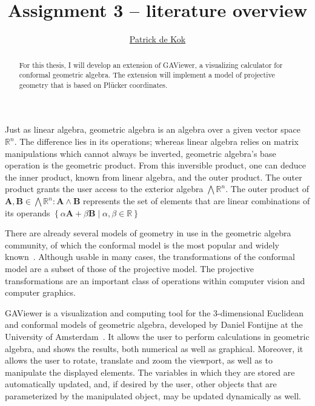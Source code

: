 \documentclass[a4paper,11pt,twoside]{article}
\title{Assignment 3 -- literature overview}
\author{\href{mailto:pkok@science.uva.nl}{Patrick de Kok}}
\newcommand{\V}[1]{\ensuremath{\mathbf{#1}}}
\newcommand{\reals}{\ensuremath{\mathbb{R}}}
\begin{document}
\maketitle
\begin{abstract}
For this thesis, I will develop an extension of GAViewer, a visualizing calculator for conformal geometric algebra.  The extension will implement a model of projective geometry that is based on Pl\"ucker coordinates.
\end{abstract}

Just as linear algebra, geometric algebra is an algebra over a given vector space $\reals^n$.  The difference lies in its operations; whereas linear algebra relies on matrix manipulations which cannot always be inverted, geometric algebra's base operation is the geometric product.  From this inversible product, one can deduce the inner product, known from linear algebra, and the outer product.  The outer product grants the user access to the exterior algebra $\bigwedge \reals^n$.  The outer product of $\V{A}, \V{B} \in \bigwedge \reals^n: \V{A} \wedge \V{B}$ represents the set of elements that are linear combinations of its operands $\left\{\alpha \V{A} + \beta \V{B} \mid \alpha, \beta \in \reals \right\}$

There are already several models of geometry in use in the geometric algebra community, of which the conformal model is the most popular and widely known~\cite{TheBook}.  Although usable in many cases, the transformations of the conformal model are a subset of those of the projective model. The projective transformations are an important class of operations within computer vision and computer graphics. 

GAViewer is a visualization and computing tool for the 3-dimensional Euclidean and conformal models of geometric algebra, developed by Daniel Fontijne at the University of Amsterdam~\cite{GAViewer}.  It allows the user to perform calculations in geometric algebra, and shows the results, both numerical as well as graphical.  Moreover, it allows the user to rotate, translate and zoom the viewport, as well as to manipulate the displayed elements.  The variables in which they are stored are automatically updated, and, if desired by the user, other objects that are parameterized by the manipulated object, may be updated dynamically as well.
\end{document}
